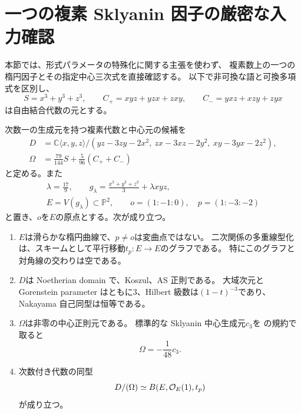 \section{一つの複素 Sklyanin 因子の厳密な入力確認}
\label{esi:sec:input}

本節では、形式パラメータの特殊化に関する主張を使わず、
複素数上の一つの楕円因子とその指定中心三次式を直接確認する。
以下で非可換な語と可換多項式を区別し、
\[
 S=x^3+y^3+z^3,\qquad
 C_+=xyz+yzx+zxy,\qquad C_-=yxz+xzy+zyx
\]
は自由結合代数の元とする。

\begin{proposition}[指定中心元を持つ具体的楕円因子]
\label{esi:prop:factor}
次数一の生成元を持つ複素代数と中心元の候補を
\begin{equation}\label{esi:eq:factor}
 \begin{split}
 D&=\mathbb C\langle x,y,z\rangle/
 (yz-3zy-2x^2,\ zx-3xz-2y^2,\ xy-3yx-2z^2),\\
 \Omega&=\frac{79}{144}S+\frac5{96}(C_++C_-)
 \end{split}
\end{equation}
と定める。また
\begin{equation}\label{esi:eq:elliptic-curve}
 \begin{gathered}
  \lambda=\frac{17}{9},\qquad
  g_\lambda=\frac{x^3+y^3+z^3}{3}+\lambda xyz,\\
  E=V(g_\lambda)\subset\mathbb P^2,\qquad
  o=(1:-1:0),\quad p=(1:-3:-2)
 \end{gathered}
\end{equation}
と置き、$o$を$E$の原点とする。次が成り立つ。
\begin{enumerate}
 \item $E$は滑らかな楕円曲線で、$p\ne o$は変曲点ではない。
 二次関係の多重線型化は、スキームとして平行移動$t_p:E\to E$のグラフである。
 特にこのグラフと対角線の交わりは空である。
 \item $D$は Noetherian domain で、Koszul、AS 正則である。
 大域次元と Gorenstein parameter はともに$3$、Hilbert 級数は$(1-t)^{-3}$であり、
 Nakayama 自己同型は恒等である。
 \item $\Omega$は非零の中心正則元である。
 標準的な Sklyanin 中心生成元$c_3$を
 \cite[Sections~1--2, pp.~1, 3]{GRSklyaninDLL}の規約で取ると
 \begin{equation}\label{esi:eq:center-normalization}
  \Omega=-\frac1{48}c_3.
 \end{equation}
 \item 次数付き代数の同型
 \begin{equation}\label{esi:eq:thcr}
  D/(\Omega)\simeq B(E,\mathcal O_E(1),t_p)
 \end{equation}
 が成り立つ。
\end{enumerate}
\end{proposition}
